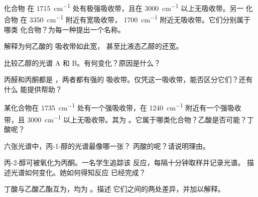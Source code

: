\begin{exercise}[$\star\star$]\label{exo:g11:infrared:6}
化合物  在
\qty{1715}{cm^{-1}} 处有极强吸收带，且在 \qty{3000}{cm^{-1}} 以上无吸收带。另一
化合物  在 \qty{3350}{cm^{-1}} 附近有宽吸收带，
\qty{1700}{cm^{-1}} 附近无吸收带。它们分别属于哪类
化合物？为每一种提出一个名称。
\end{exercise}

\begin{exercise}[$\star\star$]\label{exo:g11:infrared:7}
解释为何乙酸的  吸收带如此宽，
甚至比液态乙醇的还宽。
\end{exercise}

\begin{exercise}[$\star\star$]\label{exo:g11:infrared:8}
比较乙醇的光谱 A 和 B。有何变化？原因是什么？
\end{exercise}

\begin{exercise}[$\star\star$]\label{exo:g11:infrared:9}
丙醛和丙酮都是 ，两者都有强的 
吸收带。仅凭这一吸收带，能否区分它们？还有什么
能提供帮助？
\end{exercise}

\begin{exercise}[$\star\star$]\label{exo:g11:infrared:10}
某化合物在 \qty{1735}{cm^{-1}} 处有一个强吸收带，在
\qty{1240}{cm^{-1}} 附近有一个强吸收带，且 \qty{3000}{cm^{-1}} 以上无吸收带。其为
。它属于哪类化合物？乙酸是否可能？丁
酸呢？
\end{exercise}

\begin{exercise}[$\star\star$]\label{exo:g11:infrared:11}
六张光谱中，丙-1-醇的光谱最像哪一张？
丙酸的呢？请说明理由。
\end{exercise}

\begin{exercise}[$\star\star\star$]\label{exo:g11:infrared:12}
丙-2-醇可被氧化为丙酮。一名学生追踪该
反应，每隔十分钟取样并记录光谱。
描述光谱如何变化。她如何得知反应
已经完成？
\end{exercise}

\begin{exercise}[$\star\star\star$]\label{exo:g11:infrared:13}
丁酸与乙酸乙酯互为，均为 。描述
它们之间的两处差异，并加以解释。
\end{exercise}

